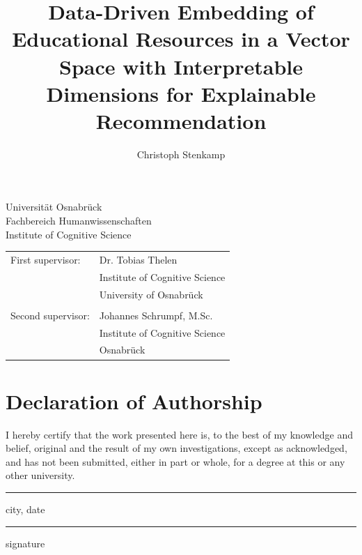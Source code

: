 \documentclass[11pt,
  paper=a4, 
  hidelinks,
  bibliography=totocnumbered,
	captions=tableheading,
	BCOR=10mm
]{scrreprt}
\title{Data-Driven Embedding of Educational Resources in a Vector Space with Interpretable Dimensions for Explainable Recommendation}
\author{Christoph Stenkamp}
\theoremstyle{definition}
\newcommand{\namesigdate}[1][5cm]{%
	\vspace{5cm}
	{\setlength{\parindent}{0cm}
	\begin{minipage}{0.3\textwidth}
		\hrule 
		\vspace{0.5cm}
		{\small city, date}
	\end{minipage}
	 \hfill
	\begin{minipage}{0.3\textwidth}
		\hrule
		\vspace{0.5cm}
	    {\small signature}
	\end{minipage}
	}
}
\begin{document}
\begin{titlepage}
	\begin{flushleft}
		Universität Osnabrück\\
		Fachbereich Humanwissenschaften\\
		Institute of Cognitive Science
	\end{flushleft}

	\vspace{2cm}
	\vspace{1cm}

	\begin{tabular}{ll}
		First supervisor:  & Dr. Tobias Thelen          \\
		                   & Institute of Cognitive Science \\
		                   & University of Osnabrück  \\\\
		Second supervisor: & Johannes Schrumpf, M.Sc.         \\
		                   & Institute of Cognitive Science \\
		                   & Osnabrück
	\end{tabular}

\end{titlepage}


\chapter*{Declaration of Authorship}
I hereby certify that the work presented here is, to the best of my knowledge and belief, original and the result of my own investigations, except as acknowledged, and has not been submitted, either in part or whole, for a degree at this or any other university.

\namesigdate
{}
\pagebreak
\end{document}
